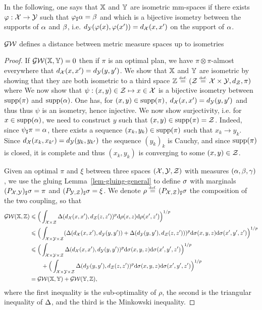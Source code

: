 In the following, one says that $\mathbb{X}$ and $\mathbb{Y}$ are isometric mm-spaces if there exists $\varphi : \mathcal{X} \rightarrow \mathcal{Y}$ such that $\varphi_{\sharp}\alpha=\beta$ and which is a bijective isometry between the supports of $\alpha$ and $\beta$, i.e. $d_{\mathcal{Y}}(\varphi(x),\varphi(x'))=d_{\mathcal{X}}(x,x')$ on the support of $\alpha$.
 

\begin{thm}
	$\operatorname{\mathcal{GW}}$ defines a distance between metric measure spaces up to isometries
\end{thm}
\begin{proof}
	If $\operatorname{\mathcal{GW}}( \mathbb{X},\mathbb{Y} )=0$ then if $\pi$ is an optimal plan, we have $\pi \otimes \pi$-almost everywhere that $d_{\mathcal{X}}(x,x')=d_{\mathcal{Y}}(y,y')$.
	We show that $\mathbb{X}$ and $\mathbb{Y}$ are isometric by showing that they are both isometric to a third space $\mathbb{Z} \stackrel{\mbox{\upshape\tiny def.}}{=} (\mathcal{Z} \stackrel{\mbox{\upshape\tiny def.}}{=} \mathcal{X} \times \mathcal{Y},d_{\mathcal{Z}},\pi)$
	where 
	We now show that $\psi : (x,y) \in \mathcal{Z} \mapsto x \in \mathcal{X}$ is a bijective isometry between $\operatorname{supp}(\pi)$ and $\operatorname{supp}(\alpha)$.
	One has, for $(x,y) \in \operatorname{supp}(\pi)$, $d_{\mathcal{X}}(x,x')=d_{\mathcal{Y}}(y,y')$ and thus
	thus $\psi$ is an isometry, hence injective. We now show surjectivity, i.e. for $x \in \operatorname{supp}(\alpha)$, we need to construct $y$ such that $(x,y) \in \operatorname{supp}(\pi)=\mathcal{Z}$. Indeed, since $\psi_\sharp \pi = \alpha$, there exists a sequence $(x_k,y_k) \in \operatorname{supp}(\pi)$ such that $x_k \rightarrow y_k$.
	Since $d_{\mathcal{X}}(x_k,x_{k'})=d_{\mathcal{Y}}(y_k,y_{k'})$ the sequence $(y_k)_k$ is Cauchy, and since $\operatorname{supp}(\pi)$ is closed, it is complete and thus $(x_k,y_k)$ is converging to some $(x,y) \in \mathcal{Z}$. 
		
	Given an optimal $\pi$ and $\xi$ between three spaces $(\mathcal{X},\mathcal{Y},\mathcal{Z})$ with measures $(\alpha,\beta,\gamma)$, we use the gluing Lemma~\ref{lem-gluing-general} to define $\sigma$ with marginals $(P_{\mathcal{X},\mathcal{Y}})_\sharp \sigma = \pi$ and $(P_{\mathcal{Y},\mathcal{Z}})_\sharp \sigma = \xi$. 
	We denote $\rho \stackrel{\mbox{\upshape\tiny def.}}{=} (P_{\mathcal{X},\mathcal{Z}})_\sharp \sigma$ the composition of the two coupling, so that
	$$\begin{aligned}
		\operatorname{\mathcal{GW}}( \mathbb{X},\mathbb{Z} ) & \leqslant \Big( \int_{\mathcal{X} \times \mathcal{Z}} \Delta(d_{\mathcal{X}}(x,x'),d_{\mathcal{Z}}(z,z'))^p \mathrm{d}\rho(x,z)\mathrm{d}\rho(x',z') \Big)^{1/p}  
			\\
		 &\leqslant \Big( \int_{\mathcal{X} \times \mathcal{Y} \times \mathcal{Z}} ( \Delta(d_{\mathcal{X}}(x,x'),d_{\mathcal{Y}}(y,y')) + \Delta(d_{\mathcal{Y}}(y,y'),d_{\mathcal{Z}}(z,z')) )^p \mathrm{d}\sigma(x,y,z) \mathrm{d}\sigma(x',y',z')\Big)^{1/p} \\
		 &\leqslant \Big( \int_{\mathcal{X} \times \mathcal{Y} \times \mathcal{Z}} \Delta(d_{\mathcal{X}}(x,x'),d_{\mathcal{Y}}(y,y'))^p \mathrm{d}\sigma(x,y,z) \mathrm{d}\sigma(x',y',z')\Big)^{1/p} \\
		 &\qquad + 
		 \Big( \int_{\mathcal{X} \times \mathcal{Y} \times \mathcal{Z}} \Delta(d_{\mathcal{Y}}(y,y'),d_{\mathcal{Z}}(z,z'))^p \mathrm{d}\sigma(x,y,z) \mathrm{d}\sigma(x',y',z')\Big)^{1/p}
		  \\
		  &= \operatorname{\mathcal{GW}}( \mathbb{X},\mathbb{Y} ) + \operatorname{\mathcal{GW}}( \mathbb{Y},\mathbb{Z} ), 
	\end{aligned}$$
	where the first inequality is the sub-optimality of $\rho$, the second is the triangular inequality of $\Delta$, 
	and the third is the Minkowski inequality.
\end{proof}


